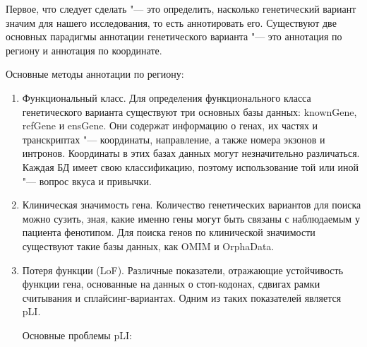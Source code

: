\documentclass[a4paper,12pt]{article}
\begin{document}
Первое, что следует сделать "--- это определить, насколько генетический вариант значим для нашего исследования, то есть аннотировать его.
Существуют две основных парадигмы аннотации генетического варианта "--- это аннотация по региону и аннотация по координате.

Основные методы аннотации по региону:

\begin{enumerate}
\item Функциональный класс.
Для определения функционального класса генетического варианта существуют три основных базы данных: knownGene, refGene и ensGene.
Они содержат информацию о генах, их частях и транскриптах "--- координаты, направление, а также номера экзонов и интронов.
Координаты в этих базах данных могут незначительно различаться.
Каждая БД имеет свою классификацию, поэтому использование той или иной "--- вопрос вкуса и привычки.

\item Клиническая значимость гена.
Количество генетических вариантов для поиска можно сузить, зная, какие именно гены могут быть связаны с наблюдаемым у пациента фенотипом.
Для поиска генов по клинической значимости существуют такие базы данных, как OMIM и OrphaData.

\item Потеря функции (LoF).
Различные показатели, отражающие устойчивость функции гена, основанные на данных о стоп-кодонах, сдвигах рамки считывания и сплайсинг-вариантах.
Одним из таких показателей является pLI.

Основные проблемы pLI\cite{ziegler}:


\end{enumerate}
\end{document}

